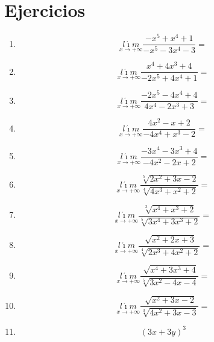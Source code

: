 \documentclass[oneside,spanish,letter]{article}
\begin{document}
\section{Ejercicios}
\begin{enumerate}
 \item $$\underset{x\rightarrow +\infty}{l\acute{\imath}m} \frac{-x^5+x^4+1}{-x^5-3x^4-3}=$$
 \item $$\underset{x\rightarrow +\infty}{l\acute{\imath}m} \frac{x^4+4x^3+4}{-2x^5+4x^4+1}=$$
 \item $$\underset{x\rightarrow +\infty}{l\acute{\imath}m} \frac{-2x^5-4x^4+4}{4x^4-2x^3+3}=$$
 \item $$\underset{x\rightarrow +\infty}{l\acute{\imath}m} \frac{4x^2-x+2}{-4x^4+x^3-2}=$$
 \item $$\underset{x\rightarrow +\infty}{l\acute{\imath}m} \frac{-3x^4-3x^3+4}{-4x^2-2x+2}=$$
 \item $$\underset{x\rightarrow +\infty}{l\acute{\imath}m} \frac{\sqrt[5]{2x^2+3x-2}}{\sqrt[4]{4x^3+x^2+2}}=$$
 \item $$\underset{x\rightarrow +\infty}{l\acute{\imath}m} \frac{\sqrt[3]{x^4+x^3+2}}{\sqrt[5]{3x^4+3x^3+2}}=$$
 \item $$\underset{x\rightarrow +\infty}{l\acute{\imath}m} \frac{\sqrt[]{x^2+2x+3}}{\sqrt[4]{2x^3+4x^2+2}}=$$
 \item $$\underset{x\rightarrow +\infty}{l\acute{\imath}m} \frac{\sqrt[]{x^4+3x^3+4}}{\sqrt[5]{3x^2-4x-4}}=$$
 \item $$\underset{x\rightarrow +\infty}{l\acute{\imath}m} \frac{\sqrt[]{x^2+3x-2}}{\sqrt[3]{4x^2+3x-3}}=$$
\item $$(3x+3y)^3$$
 \end{enumerate}
  \newpage
\end{document}
